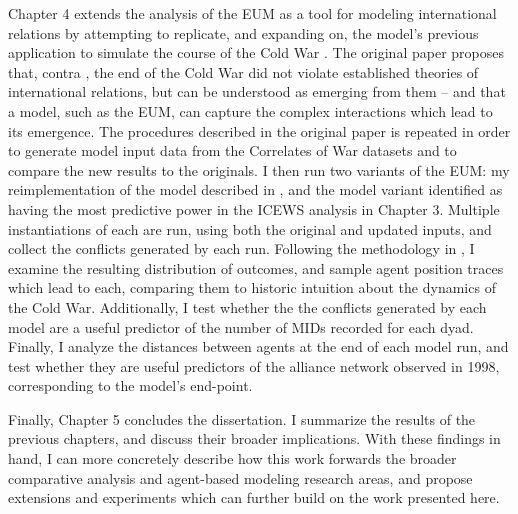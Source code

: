 Chapter 4 extends the analysis of the EUM as a tool for modeling international relations by attempting to replicate, and expanding on, the model's previous application to simulate the course of the Cold War \citep{bdm_1998}. The original paper proposes that, contra \citet{gaddis_1992}, the end of the Cold War did not violate established theories of international relations, but can be understood as emerging from them -- and that a model, such as the EUM, can capture the complex interactions which lead to its emergence. The procedures described in the original paper is repeated in order to generate model input data from the Correlates of War datasets and to compare the new results to the originals. I then run two variants of the EUM: my reimplementation of the model described in \citet{bdm_2002}, and the model variant identified as having the most predictive power in the ICEWS analysis in Chapter 3. Multiple instantiations of each are run, using both the original and updated inputs, and collect the conflicts generated by each run. Following the methodology in \citet{bdm_1998}, I examine the resulting distribution of outcomes, and sample agent position traces which lead to each, comparing them to historic intuition about the dynamics of the Cold War. Additionally, I test whether the the conflicts generated by each model are a useful predictor of the number of MIDs recorded for each dyad. Finally, I analyze the distances between agents at the end of each model run, and test whether they are useful predictors of the alliance network observed in 1998, corresponding to the model's end-point.

Finally, Chapter 5 concludes the dissertation. I summarize the results of the previous chapters, and discuss their broader implications. With these findings in hand, I can more concretely describe how this work forwards the broader comparative analysis and agent-based modeling research areas, and propose  extensions and experiments which can further build on the work presented here.
